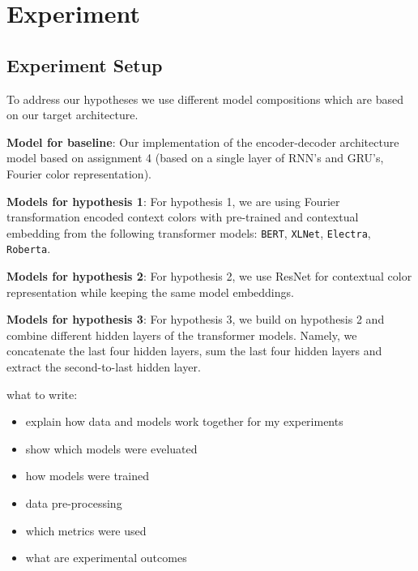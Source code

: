 \section{Experiment}

\subsection{Experiment Setup}
To address our hypotheses we use different model compositions which are based on our target architecture.

\textbf{Model for baseline}:
Our implementation of the encoder-decoder architecture model based on assignment 4 (based on a single layer of RNN’s and GRU’s, Fourier color representation).

\textbf{Models for hypothesis 1}:
For hypothesis 1, we are using Fourier transformation encoded context colors with pre-trained and contextual embedding from the following transformer models: \texttt{BERT}, \texttt{XLNet}, \texttt{Electra}, \texttt{Roberta}.

\textbf{Models for hypothesis 2}:
For hypothesis 2, we use ResNet for contextual color representation while keeping the same model embeddings.

\textbf{Models for hypothesis 3}:
For hypothesis 3, we build on hypothesis 2 and combine different hidden layers of the transformer models. Namely, we concatenate the last four hidden layers, sum the last four hidden layers and extract the second-to-last hidden layer.

\bigbreak
what to write:
\begin{itemize}
  \item explain how data and models work together for my experiments
  \item show which models were eveluated
  \item how models were trained
  \item data pre-processing
  \item which metrics were used
  \item what are experimental outcomes
\end{itemize}